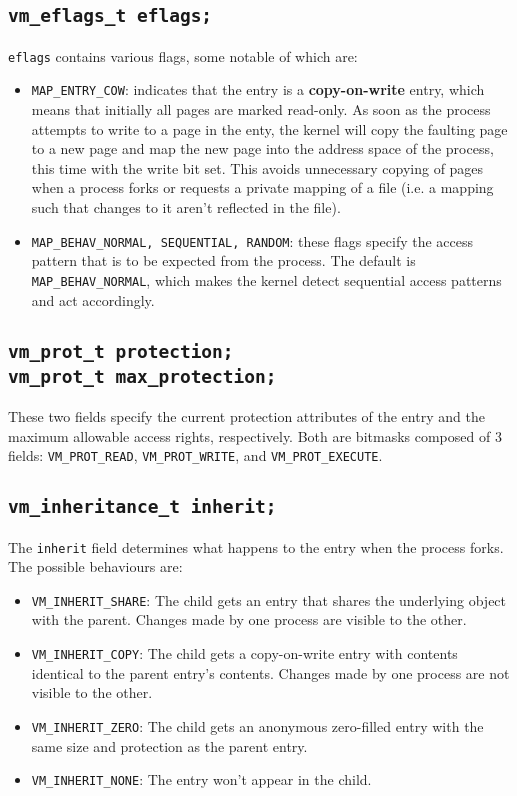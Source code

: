 \documentclass[shortabstract, english]{iithesis}
\begin{document}
\subsection*{\texttt{vm_eflags_t eflags;}}
\texttt{eflags} contains various flags, some notable of which are:
\begin{itemize}
\item \texttt{MAP_ENTRY_COW}: indicates that the entry is a
  \textbf{copy-on-write} entry, which means that initially all pages are marked
  read-only. As soon as the process attempts to write to a page in the enty, the
  kernel will copy the faulting page to a new page and map the new page into the
  address space of the process, this time with the write bit set. This avoids
  unnecessary copying of pages when a process forks or requests a private
  mapping of a file (i.e. a mapping such that changes to it aren't reflected in
  the file).
\item \texttt{MAP_BEHAV_{NORMAL, SEQUENTIAL, RANDOM}}: these flags
  specify the access pattern that is to be expected from the process. The
  default is \texttt{MAP_BEHAV_NORMAL}, which makes the kernel detect
  sequential access patterns and act accordingly.
\end{itemize}

\subsection*{\texttt{vm_prot_t protection;} \\
  \texttt{vm_prot_t max_protection;}}
These two fields specify the current protection attributes of the entry and the
maximum allowable access rights, respectively. Both are bitmasks composed of 3
fields: \texttt{VM_PROT_READ}, \texttt{VM_PROT_WRITE}, and
\texttt{VM_PROT_EXECUTE}.

\subsection*{\texttt{vm_inheritance_t inherit;}}
The \texttt{inherit} field determines what happens to the entry when the
process forks. The possible behaviours are:
\begin{itemize}
\item \texttt{VM_INHERIT_SHARE}: The child gets an entry that shares the
  underlying object with the parent. Changes made by one process are visible to
  the other.
\item \texttt{VM_INHERIT_COPY}: The child gets a copy-on-write entry with
  contents identical to the parent entry's contents. Changes made by one process
  are not visible to the other.
\item \texttt{VM_INHERIT_ZERO}: The child gets an anonymous zero-filled
  entry with the same size and protection as the parent entry.
\item \texttt{VM_INHERIT_NONE}: The entry won't appear in the child.
\end{itemize}
\end{document}
